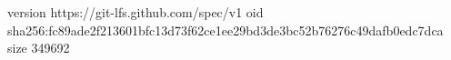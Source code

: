version https://git-lfs.github.com/spec/v1
oid sha256:fc89ade2f213601bfc13d73f62ce1ee29bd3de3bc52b76276c49dafb0edc7dca
size 349692
